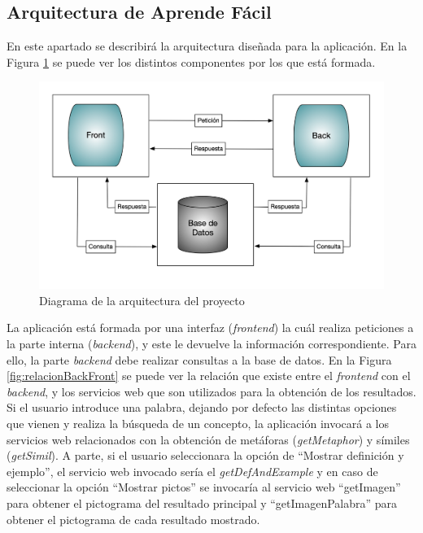 \subsection{Arquitectura de Aprende Fácil}
En este apartado se describirá la arquitectura diseñada para la aplicación. En la Figura \ref{fig:diagrama_arquitectura} se puede ver los distintos componentes por los que está formada.

\begin{figure}[!h]
	\includegraphics[width=.9\textwidth]{Imagenes/Bitmap/Capitulo4/DiagramaArquitectura.png}
	\centering
	\caption{Diagrama de la arquitectura del proyecto}
	\label{fig:diagrama_arquitectura}
\end{figure}

La aplicación está formada por una interfaz (\textit{frontend}) la cuál realiza peticiones a la parte interna (\textit{backend}), y este le devuelve la información correspondiente. Para ello, la parte \textit{backend} debe realizar consultas a la base de datos. En la Figura \ref{fig:relacionBackFront}  se puede ver la relación que existe entre el \textit{frontend} con el \textit{backend}, y los servicios web que son utilizados para la obtención de los resultados.
Si el usuario introduce una palabra, dejando por defecto las distintas opciones que vienen y realiza la búsqueda de un concepto, la aplicación invocará a los servicios web relacionados con la obtención de metáforas (\textit{getMetaphor}) y símiles (\textit{getSimil}). A parte, si el usuario seleccionara la opción de ``Mostrar definición y ejemplo'', el servicio web invocado sería el \textit{getDefAndExample} y en caso de seleccionar la opción  ``Mostrar pictos'' se invocaría al servicio web ``getImagen'' para obtener el pictograma del resultado principal y ``getImagenPalabra'' para obtener el pictograma de cada resultado mostrado.

